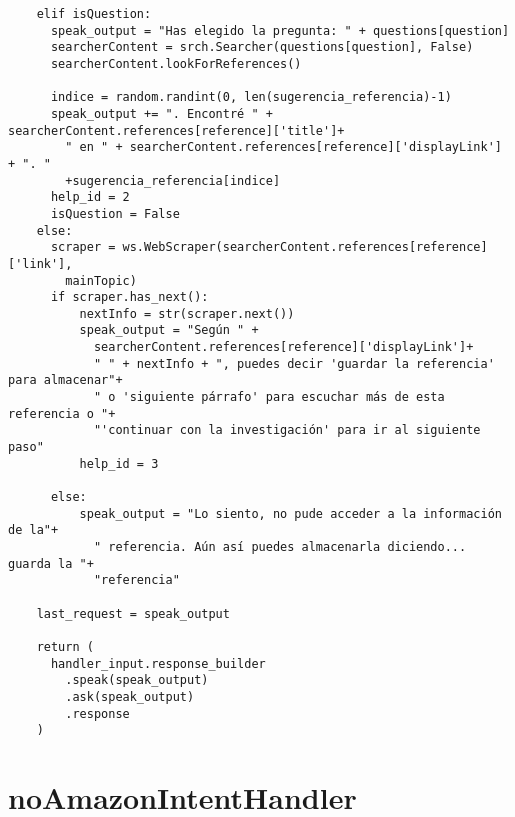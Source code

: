 \begin{tcolorbox}[colback=white!25!white,colframe=blue]
  \begin{verbatim}   
    elif isQuestion:
      speak_output = "Has elegido la pregunta: " + questions[question]
      searcherContent = srch.Searcher(questions[question], False)
      searcherContent.lookForReferences()
      
      indice = random.randint(0, len(sugerencia_referencia)-1)
      speak_output += ". Encontré " + searcherContent.references[reference]['title']+ 
        " en " + searcherContent.references[reference]['displayLink'] + ". "
        +sugerencia_referencia[indice]
      help_id = 2
      isQuestion = False
    else:
      scraper = ws.WebScraper(searcherContent.references[reference]['link'],
        mainTopic)
      if scraper.has_next():
          nextInfo = str(scraper.next())
          speak_output = "Según " +
            searcherContent.references[reference]['displayLink']+
            " " + nextInfo + ", puedes decir 'guardar la referencia' para almacenar"+
            " o 'siguiente párrafo' para escuchar más de esta referencia o "+
            "'continuar con la investigación' para ir al siguiente paso"
          help_id = 3
          
      else:
          speak_output = "Lo siento, no pude acceder a la información de la"+
            " referencia. Aún así puedes almacenarla diciendo... guarda la "+
            "referencia"
  
    last_request = speak_output
        
    return (
      handler_input.response_builder
        .speak(speak_output)
        .ask(speak_output)
        .response
    )
  \end{verbatim}
\end{tcolorbox}


\section{noAmazonIntentHandler}
\label{A8Anexo}

